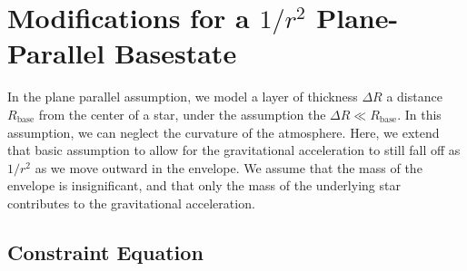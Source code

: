 
\section{\label{app:gravity} Modifications for a $1/r^2$ Plane-Parallel Basestate}

In the plane parallel assumption, we model a layer of thickness
$\Delta R$ a distance $R_\mathrm{base}$ from the center of a star,
under the assumption the $\Delta R \ll R_\mathrm{base}$.  In this
assumption, we can neglect the curvature of the atmosphere.  Here, we 
extend that basic assumption to allow for the gravitational acceleration
to still fall off as $1/r^2$ as we move outward in the envelope.  We assume
that the mass of the envelope is insignificant, and that only the mass of 
the underlying star contributes to the gravitational acceleration.

\subsection{Constraint Equation}

